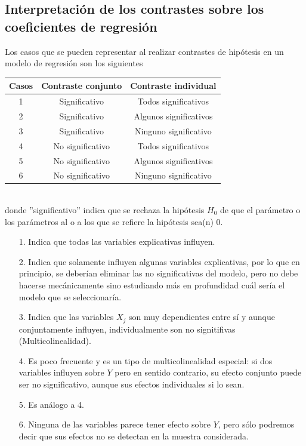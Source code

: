 \subsection{Interpretación de los contrastes sobre los coeficientes de regresión}
\noindent Los casos que se pueden representar al realizar contrastes de hipótesis en un modelo de regresión son los siguientes

\begin{center}
\begin{tabular}{|c|c|c|}
\hline
Casos & Contraste conjunto & Contraste individual   \\ \hline
1     & Significativo      & Todos significativos   \\
2     & Significativo      & Algunos significativos \\
3     & Significativo      & Ninguno significativo  \\
4     & No significativo   & Todos significativos   \\
5     & No significativo   & Algunos significativos \\
6     & No significativo   & Ninguno significativo  \\ \hline
\end{tabular}
\end{center}
\\
\newline
donde ''significativo'' indica que se rechaza la hipótesis $H_0$ de que el parámetro o los parámetros al o a los que se refiere la hipótesis sea(n) 0.

\begin{enumerate}
    \item[1.] Indica que todas las variables explicativas influyen.
    \item[2.] Indica que solamente influyen algunas variables explicativas, por lo que en principio, se deberían eliminar las no significativas del modelo, pero no debe hacerse mecánicamente sino estudiando más en profundidad cuál sería el modelo que se seleccionaría.
    \item[3.] Indica que las variables $X_j$ son muy dependientes entre sí y aunque conjuntamente influyen, individualmente son no signitifivas (Multicolinealidad).
    \item[4.] Es poco frecuente y es un tipo de multicolinealidad especial: si dos variables influyen sobre $Y$ pero en sentido contrario, su efecto conjunto puede ser no significativo, aunque sus efectos individuales si lo sean.
    \item[5.] Es análogo a 4.
    \item[6.] Ninguna de las variables parece tener efecto sobre $Y$, pero sólo podremos decir que sus efectos no se detectan en la muestra considerada.
\end{enumerate}

